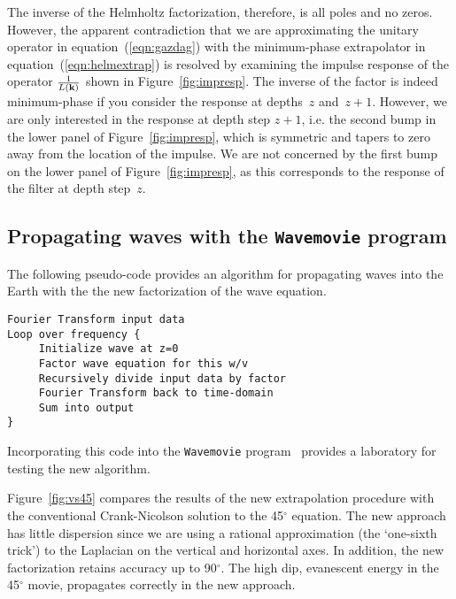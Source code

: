 \par
The inverse of the Helmholtz factorization, therefore, is all poles
and no zeros. 
However, the apparent contradiction that we are approximating the
unitary operator in equation~(\ref{eqn:gazdag}) with the minimum-phase
extrapolator in equation~(\ref{eqn:helmextrap}) is resolved by
examining the impulse response of the operator $\frac{1}{L({\bf
k})}$ shown in Figure~\ref{fig:impresp}. The inverse of the factor is
indeed minimum-phase if you consider the response at depths~$z$
and~$z+1$. However, we are only interested in the response at depth
step $z+1$, i.e. the second bump in the lower panel of
Figure~\ref{fig:impresp}, which is symmetric and tapers to zero away
from the location of the impulse.
We are not concerned by the first bump on
the lower panel of Figure~\ref{fig:impresp}, as this corresponds to
the response of the filter at depth step~$z$.

\subsection{Propagating waves with the {\tt Wavemovie} program}
The following pseudo-code provides an algorithm for propagating waves
into the Earth with the the new factorization of the wave
equation. 
\begin{verbatim}
Fourier Transform input data
Loop over frequency {
     Initialize wave at z=0
     Factor wave equation for this w/v
     Recursively divide input data by factor
     Fourier Transform back to time-domain
     Sum into output
}
\end{verbatim}
Incorporating this code into the {\tt Wavemovie}
program~\cite{iei} provides a laboratory for testing the new
algorithm. 

\par
Figure~\ref{fig:vs45} compares the results of the new extrapolation
procedure with the conventional Crank-Nicolson solution to the
45$^\circ$ equation. The new approach has little dispersion since we
are using a rational approximation (the `one-sixth trick') to the
Laplacian on the vertical and horizontal axes.  In addition, the new
factorization retains accuracy up to 90$^\circ$. The high dip,
evanescent energy in the 45$^\circ$ movie, propagates correctly in the
new approach.

